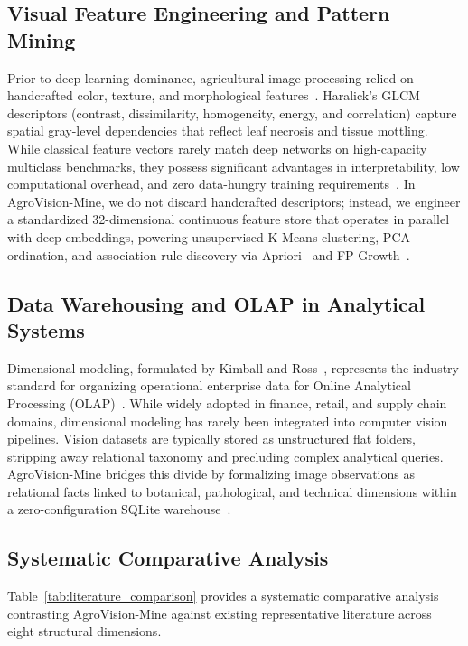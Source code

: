 \documentclass[conference]{IEEEtran}
\begin{document}
\subsection{Visual Feature Engineering and Pattern Mining}
Prior to deep learning dominance, agricultural image processing relied on handcrafted color, texture, and morphological features~\cite{haralick1973texture}. Haralick's GLCM descriptors (contrast, dissimilarity, homogeneity, energy, and correlation) capture spatial gray-level dependencies that reflect leaf necrosis and tissue mottling. While classical feature vectors rarely match deep networks on high-capacity multiclass benchmarks, they possess significant advantages in interpretability, low computational overhead, and zero data-hungry training requirements~\cite{pedregosa2011scikit}. In AgroVision-Mine, we do not discard handcrafted descriptors; instead, we engineer a standardized 32-dimensional continuous feature store that operates in parallel with deep embeddings, powering unsupervised K-Means clustering, PCA ordination, and association rule discovery via Apriori~\cite{agrawal1994apriori} and FP-Growth~\cite{han2000fpgrowth}.

\subsection{Data Warehousing and OLAP in Analytical Systems}
Dimensional modeling, formulated by Kimball and Ross~\cite{kimball2013datawarehouse}, represents the industry standard for organizing operational enterprise data for Online Analytical Processing (OLAP)~\cite{codd1993olap}. While widely adopted in finance, retail, and supply chain domains, dimensional modeling has rarely been integrated into computer vision pipelines. Vision datasets are typically stored as unstructured flat folders, stripping away relational taxonomy and precluding complex analytical queries. AgroVision-Mine bridges this divide by formalizing image observations as relational facts linked to botanical, pathological, and technical dimensions within a zero-configuration SQLite warehouse~\cite{hipp2020sqlite}.

\subsection{Systematic Comparative Analysis}
Table~\ref{tab:literature_comparison} provides a systematic comparative analysis contrasting AgroVision-Mine against existing representative literature across eight structural dimensions.
\end{document}
